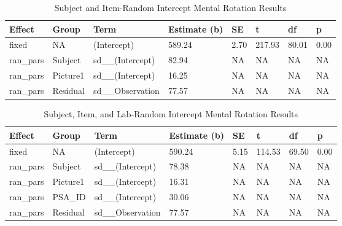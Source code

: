 \documentclass[
  man,floatsintext]{apa7}
\begin{document}
\begin{table}[tbp]

\begin{center}
\begin{threeparttable}

\caption{\label{tab:item_e}Subject and Item-Random Intercept Mental Rotation Results}

\begin{tabular}{llllllll}
\toprule
Effect & Group & Term & Estimate (b) & SE & t & df & p\\
\midrule
fixed & NA & (Intercept) & 589.24 & 2.70 & 217.93 & 80.01 & 0.00\\
ran\_pars & Subject & sd\_\_(Intercept) & 82.94 & NA & NA & NA & NA\\
ran\_pars & Picture1 & sd\_\_(Intercept) & 16.25 & NA & NA & NA & NA\\
ran\_pars & Residual & sd\_\_Observation & 77.57 & NA & NA & NA & NA\\
\bottomrule
\end{tabular}

\end{threeparttable}
\end{center}

\end{table}

\begin{table}[tbp]

\begin{center}
\begin{threeparttable}

\caption{\label{tab:lab_e}Subject, Item, and Lab-Random Intercept Mental Rotation Results}

\begin{tabular}{llllllll}
\toprule
Effect & Group & Term & Estimate (b) & SE & t & df & p\\
\midrule
fixed & NA & (Intercept) & 590.24 & 5.15 & 114.53 & 69.50 & 0.00\\
ran\_pars & Subject & sd\_\_(Intercept) & 78.38 & NA & NA & NA & NA\\
ran\_pars & Picture1 & sd\_\_(Intercept) & 16.31 & NA & NA & NA & NA\\
ran\_pars & PSA\_ID & sd\_\_(Intercept) & 30.06 & NA & NA & NA & NA\\
ran\_pars & Residual & sd\_\_Observation & 77.57 & NA & NA & NA & NA\\
\bottomrule
\end{tabular}

\end{threeparttable}
\end{center}

\end{table}
\end{document}
